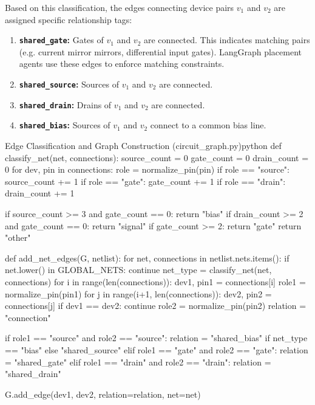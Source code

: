 Based on this classification, the edges connecting device pairs $v_1$ and $v_2$ are assigned specific relationship tags:
\begin{enumerate}
    \item \textbf{\texttt{shared\_gate}:} Gates of $v_1$ and $v_2$ are connected. This indicates matching pairs (e.g. current mirror mirrors, differential input gates). LangGraph placement agents use these edges to enforce matching constraints.
    \item \textbf{\texttt{shared\_source}:} Sources of $v_1$ and $v_2$ are connected.
    \item \textbf{\texttt{shared\_drain}:} Drains of $v_1$ and $v_2$ are connected.
    \item \textbf{\texttt{shared\_bias}:} Sources of $v_1$ and $v_2$ connect to a common bias line.
\end{enumerate}

\begin{thesiscode}{Edge Classification and Graph Construction (circuit\_graph.py)}{python}
def classify_net(net, connections):
    source_count = 0
    gate_count = 0
    drain_count = 0
    for dev, pin in connections:
        role = normalize_pin(pin)
        if role == "source": source_count += 1
        if role == "gate":   gate_count += 1
        if role == "drain":  drain_count += 1

    if source_count >= 3 and gate_count == 0:
        return "bias"
    if drain_count >= 2 and gate_count == 0:
        return "signal"
    if gate_count >= 2:
        return "gate"
    return "other"

def add_net_edges(G, netlist):
    for net, connections in netlist.nets.items():
        if net.lower() in GLOBAL_NETS:
            continue
        net_type = classify_net(net, connections)
        for i in range(len(connections)):
            dev1, pin1 = connections[i]
            role1 = normalize_pin(pin1)
            for j in range(i+1, len(connections)):
                dev2, pin2 = connections[j]
                if dev1 == dev2:
                    continue
                role2 = normalize_pin(pin2)
                relation = "connection"

                if role1 == "source" and role2 == "source":
                    relation = "shared_bias" if net_type == "bias" else "shared_source"
                elif role1 == "gate" and role2 == "gate":
                    relation = "shared_gate"
                elif role1 == "drain" and role2 == "drain":
                    relation = "shared_drain"

                G.add_edge(dev1, dev2, relation=relation, net=net)
\end{thesiscode}


